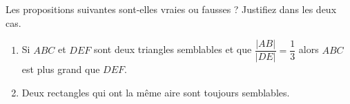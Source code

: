 %
%
    Les propositions suivantes sont-elles vraies ou fausses ? Justifiez dans les deux cas.
    \begin{enumerate}
        \item Si $ABC$ et $DEF$ sont deux triangles semblables et que $\dfrac{|AB|}{|DE|}=\dfrac{1}{3}$ alors $ABC$ est plus grand que $DEF$.
        \item Deux rectangles qui ont la même aire sont toujours semblables.
    \end{enumerate}

